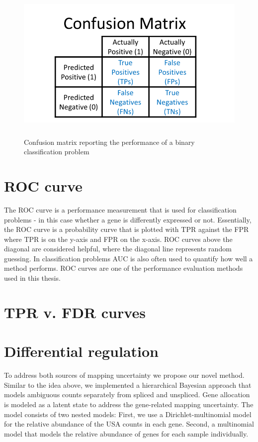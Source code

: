 \begin{figure}[!htb]
\begin{center}
\includegraphics[width=6in,height=3in]{figure/confusion_matrix.png}
\end{center}
\caption{Confusion matrix reporting the performance of a binary classification problem}
\label{fig:confusion_matrix}
\end{figure}
\FloatBarrier

\section{ROC curve}
The ROC curve is a performance measurement that is used for classification problems - in this case whether a gene is differently expressed or not. Essentially, the ROC curve is a probability curve that is plotted with TPR against the FPR where TPR is on the y-axis and FPR on the x-axis. ROC curves above the diagonal are considered helpful, where the diagonal line represents random guessing. In classification problems AUC is also often used to quantify how well a method performs. ROC curves are one of the performance evaluation methods used in this thesis.

\section{TPR v. FDR curves}


\section{Differential regulation}
To address both sources of mapping uncertainty we propose our novel method. Similar to the idea above, we implemented a hierarchical Bayesian approach that models ambiguous counts separately from spliced and unspliced. Gene allocation is modeled as a latent state to address the gene-related mapping uncertainty. The model consists of two nested models: First, we use a Dirichlet-multinomial model for the relative abundance of the USA counts in each gene. Second, a multinomial model that models the relative abundance of genes for each sample individually.


